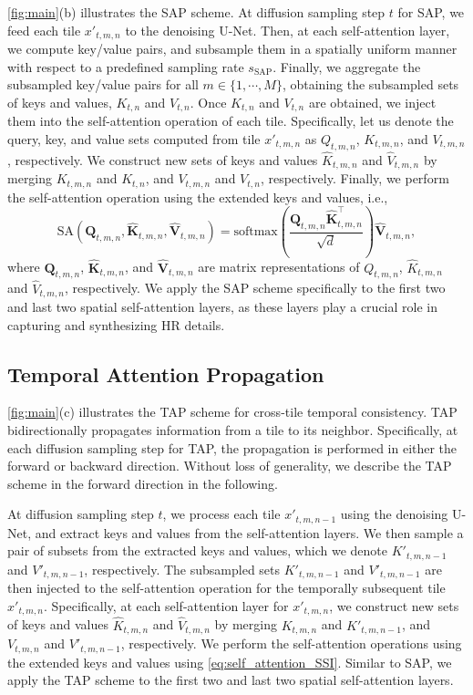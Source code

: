 \cref{fig:main}(b) illustrates the SAP scheme.
At diffusion sampling step $t$ for SAP, we feed each tile $x'_{t,m,n}$ to the denoising U-Net.
Then, at each self-attention layer, we compute key/value pairs, and subsample them in a spatially uniform manner with respect to a predefined sampling rate $s_\textrm{SAP}$.
Finally, we aggregate the subsampled key/value pairs for all $m \in \{1,\cdots,M\}$, obtaining the subsampled sets of keys and values, $K_{t,n}$ and $V_{t,n}$.
Once $K_{t,n}$ and $V_{t,n}$ are obtained, we inject them into the self-attention operation of each tile.
Specifically, let us denote the query, key, and value sets computed from tile $x'_{t,m,n}$ as $Q_{t,m,n}$, $K_{t,m,n}$, and $V_{t,m,n}$, respectively.
We construct new sets of keys and values $\hat{K}_{t,m,n}$ and $\hat{V}_{t,m,n}$ by merging $K_{t,m,n}$ and $K_{t,n}$, and $V_{t,m,n}$ and $V_{t,n}$, respectively.
Finally, we perform the self-attention operation using the extended keys and values, i.e.,
\begin{equation}
    \text{SA}(\bm{Q}_{t,m,n},\bm{\hat{K}}_{t,m,n},\bm{\hat{V}}_{t,m,n}) = \text{softmax} \left( \frac{\bm{Q}_{t,m,n}\bm{\hat{K}}_{t,m,n}^\top}{\sqrt{d}} \right) \bm{\hat{V}}_{t,m,n},
    \label{eq:self_attention_SSI}
\end{equation}
where $\bm{Q}_{t,m,n}$, $\bm{\hat{K}}_{t,m,n}$, and $\bm{\hat{V}}_{t,m,n}$ are matrix representations of $Q_{t,m,n}$, $\hat{K}_{t,m,n}$ and $\hat{V}_{t,m,n}$, respectively.
We apply the SAP scheme specifically to the first two and last two spatial self-attention layers, as these layers play a crucial role in capturing and synthesizing HR details.

\subsection{Temporal Attention Propagation}
\label{ssec:TFI}

\cref{fig:main}(c) illustrates the TAP scheme for cross-tile temporal consistency.
TAP bidirectionally propagates information from a tile to its neighbor. Specifically, at each diffusion sampling step for TAP, the propagation is performed in either the forward or backward direction.
Without loss of generality, we describe the TAP scheme in the forward direction in the following.

At diffusion sampling step $t$, we process each tile $x'_{t,m,n-1}$ using the denoising U-Net, and extract keys and values from the self-attention layers.
We then sample a pair of subsets from the extracted keys and values, which we denote $K'_{t,m,n-1}$ and $V'_{t,m,n-1}$, respectively.
The subsampled sets $K'_{t,m,n-1}$ and $V'_{t,m,n-1}$ are then injected to the self-attention operation for the temporally subsequent tile $x'_{t,m,n}$.
Specifically, at each self-attention layer for $x'_{t,m,n}$, we construct new sets of keys and values $\hat{K}_{t,m,n}$ and $\hat{V}_{t,m,n}$ by merging $K_{t,m,n}$ and $K'_{t,m,n-1}$, and $V_{t,m,n}$ and $V'_{t,m,n-1}$, respectively.
We perform the self-attention operations using the extended keys and values using \cref{eq:self_attention_SSI}.
Similar to SAP, we apply the TAP scheme to the first two and last two spatial self-attention layers.


